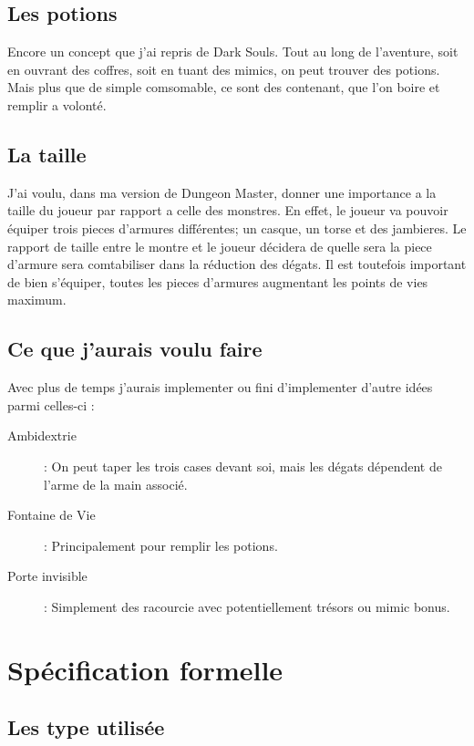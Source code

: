 \documentclass[12pt]{report}
\begin{document}
\section{Les potions}

Encore un concept que j'ai repris de Dark Souls.
Tout au long de l'aventure, soit en ouvrant des coffres, soit en tuant des mimics, on peut trouver des potions.
Mais plus que de simple comsomable, ce sont des contenant, que l'on boire et remplir a volonté.

\section{La taille}

J'ai voulu, dans ma version de Dungeon Master, donner une importance a la taille du joueur par rapport a celle des monstres.
En effet, le joueur va pouvoir équiper trois pieces d'armures différentes; un casque, un torse et des jambieres.
Le rapport de taille entre le montre et le joueur décidera de quelle sera la piece d'armure sera comtabiliser dans la réduction des dégats.
Il est toutefois important de bien s'équiper, toutes les pieces d'armures augmentant les points de vies maximum.

\section{Ce que j'aurais voulu faire}

Avec plus de temps j'aurais implementer ou fini d'implementer d'autre idées parmi celles-ci :
\begin{description}
    \item[Ambidextrie] : On peut taper les trois cases devant soi, mais les dégats dépendent de l'arme de la main associé.
    \item[Fontaine de Vie] : Principalement pour remplir les potions.
    \item[Porte invisible] : Simplement des racourcie avec potentiellement trésors ou mimic bonus.
\end{description}

\chapter{Spécification formelle}

\section{Les type utilisée}
\end{document}
